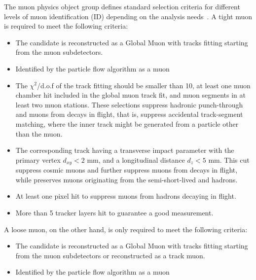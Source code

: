 The muon physics object group defines standard selection criteria for different levels of muon identification (ID) depending on the analysis needs~\cite{CMS:mu_PF}.
A tight muon is required to meet the following criteria:
\begin{itemize}
    \item The candidate is reconstructed as a Global Muon with tracks fitting starting from the muon subdetectors.
   \item Identified by the particle flow algorithm as a muon 
    \item The $\chi^2$/d.o.f of the track fitting should be smaller than 10, at least one muon chamber hit included in the global muon track fit, and muon segments in at least two muon stations.
        These selections suppress hadronic punch-through and muons from decays in flight, that is, suppress accidental track-segment matching, where the inner track might be generated from a particle other than the muon.
    \item The corresponding track having a transverse impact parameter with the primary vertex $d_{xy} < 2$ mm, and a longitudinal distance $d_z < 5$ mm.
        This cut suppress cosmic muons and further suppress muons from decays in flight, while preserves muons originating from the semi-short-lived \PQb and \PQc hadrons.
    \item At least one pixel hit to suppress muons from hadrons decaying in flight.
    \item More than 5 tracker layers hit to guarantee a good \PT measurement.
\end{itemize}

A loose muon, on the other hand, is only required to meet the following criteria:
\begin{itemize}
    \item The candidate is reconstructed as a Global Muon with tracks fitting starting from the muon subdetectors or reconstructed as a track muon.
    \item Identified by the particle flow algorithm as a muon 
\end{itemize}


